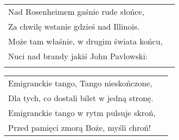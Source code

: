 \documentclass[a5paper]{article}
\begin{document}
\noindent
\begin{tabular}{@{}p{8.5cm}p{3cm}@{}}
Nad Rosenheimem gaśnie rude słońce,\\
Za chwilę wstanie gdzieś nad Illinois.\\
Może tam właśnie, w drugim świata końcu,\\
Nuci nad brandy jakiś John Pavlowski:\\\\
\end{tabular}

\noindent
\begin{tabular}{@{}p{8.5cm}p{3cm}@{}}
	Emigranckie tango, Tango nieskończone,\\
	Dla tych, co dostali bilet w jedną stronę.\\
	Emigranckie tango w rytm pulsuje skroń,\\
	Przed pamięci zmorą Boże, myśli chroń!
\end{tabular}
\end{document}
